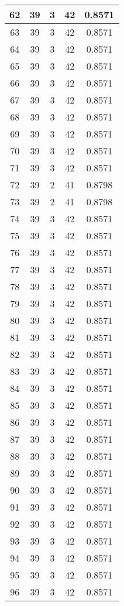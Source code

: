 \documentclass[letterpaper, 12pt]{article}
\begin{document}
\begin{longtable}{|c|c|c|c|c|}
\hline
62 & 39 & 3 & 42 & 0.8571 \\
\hline
63 & 39 & 3 & 42 & 0.8571 \\
\hline
64 & 39 & 3 & 42 & 0.8571 \\
\hline
65 & 39 & 3 & 42 & 0.8571 \\
\hline
66 & 39 & 3 & 42 & 0.8571 \\
\hline
67 & 39 & 3 & 42 & 0.8571 \\
\hline
68 & 39 & 3 & 42 & 0.8571 \\
\hline
69 & 39 & 3 & 42 & 0.8571 \\
\hline
70 & 39 & 3 & 42 & 0.8571 \\
\hline
71 & 39 & 3 & 42 & 0.8571 \\
\hline
72 & 39 & 2 & 41 & 0.8798 \\
\hline
73 & 39 & 2 & 41 & 0.8798 \\
\hline
74 & 39 & 3 & 42 & 0.8571 \\
\hline
75 & 39 & 3 & 42 & 0.8571 \\
\hline
76 & 39 & 3 & 42 & 0.8571 \\
\hline
77 & 39 & 3 & 42 & 0.8571 \\
\hline
78 & 39 & 3 & 42 & 0.8571 \\
\hline
79 & 39 & 3 & 42 & 0.8571 \\
\hline
80 & 39 & 3 & 42 & 0.8571 \\
\hline
81 & 39 & 3 & 42 & 0.8571 \\
\hline
82 & 39 & 3 & 42 & 0.8571 \\
\hline
83 & 39 & 3 & 42 & 0.8571 \\
\hline
84 & 39 & 3 & 42 & 0.8571 \\
\hline
85 & 39 & 3 & 42 & 0.8571 \\
\hline
86 & 39 & 3 & 42 & 0.8571 \\
\hline
87 & 39 & 3 & 42 & 0.8571 \\
\hline
88 & 39 & 3 & 42 & 0.8571 \\
\hline
89 & 39 & 3 & 42 & 0.8571 \\
\hline
90 & 39 & 3 & 42 & 0.8571 \\
\hline
91 & 39 & 3 & 42 & 0.8571 \\
\hline
92 & 39 & 3 & 42 & 0.8571 \\
\hline
93 & 39 & 3 & 42 & 0.8571 \\
\hline
94 & 39 & 3 & 42 & 0.8571 \\
\hline
95 & 39 & 3 & 42 & 0.8571 \\
\hline
96 & 39 & 3 & 42 & 0.8571 \\

\end{longtable}
\end{document}
